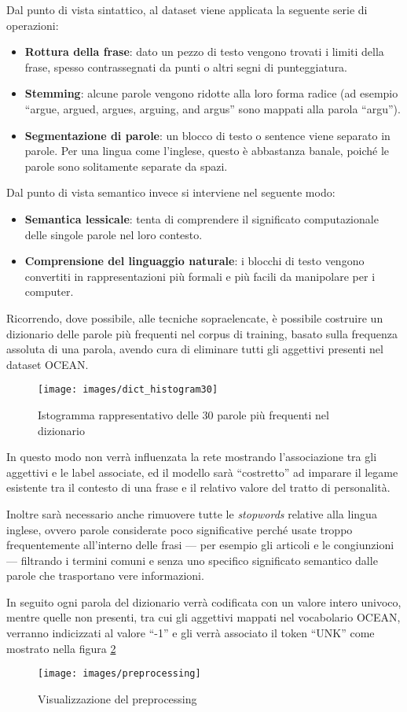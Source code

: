 Dal punto di vista sintattico, al dataset viene applicata la seguente serie di operazioni:
\begin{itemize}
	\item \textbf{Rottura della frase}: dato un pezzo di testo vengono trovati i limiti della frase, spesso contrassegnati da punti o altri segni di punteggiatura.
	\item \textbf{Stemming}: alcune parole vengono ridotte alla loro forma radice (ad esempio ``argue, argued, argues, arguing, and argus'' sono mappati alla parola ``argu'').
	\item \textbf{Segmentazione di parole}: un blocco di testo o sentence viene separato in parole. Per una lingua come l'inglese, questo è abbastanza banale, poiché le parole sono solitamente separate da spazi. 
\end{itemize}
Dal punto di vista semantico invece si interviene nel seguente modo:
\begin{itemize}
	\item \textbf{Semantica lessicale}: tenta di comprendere il significato computazionale delle singole parole nel loro contesto.
	\item \textbf{Comprensione del linguaggio naturale}: i blocchi di testo vengono convertiti in rappresentazioni più formali e più facili da manipolare per i computer. 
\end{itemize}
Ricorrendo, dove possibile, alle tecniche sopraelencate, è possibile costruire un dizionario delle  parole più frequenti nel corpus di training, basato sulla frequenza assoluta di una parola, avendo cura di eliminare tutti gli aggettivi presenti nel dataset OCEAN.

\begin{figure}[H]
	\centering
	{\texttt{[image: images/dict\_histogram30]}}
	\caption{Istogramma rappresentativo delle \num{30} parole più frequenti nel dizionario}
	\label{fig:Istrogramma del dizionario}
\end{figure}
In questo modo non verrà influenzata la rete mostrando l'associazione tra gli aggettivi e le label associate, ed il modello sarà ``costretto'' ad imparare il legame esistente tra il contesto di una frase e il relativo valore del tratto di personalità. 

Inoltre sarà necessario anche rimuovere tutte le \emph{stopwords} relative alla lingua inglese, ovvero parole considerate poco significative perché usate troppo frequentemente all'interno delle frasi --- per esempio gli articoli e le congiunzioni --- filtrando i termini comuni e senza uno specifico significato semantico dalle parole che trasportano vere informazioni.

In seguito ogni parola del dizionario verrà codificata con un valore intero univoco, mentre quelle non presenti, tra cui gli aggettivi mappati nel vocabolario OCEAN, verranno indicizzati al valore ``-1'' e gli verrà associato il token ``UNK'' come mostrato nella figura \ref{fig:preprocessing}
\begin{figure}[H]
	\centering
	{\texttt{[image: images/preprocessing]}}
	\caption{Visualizzazione del preprocessing}
	\label{fig:preprocessing}
\end{figure}

